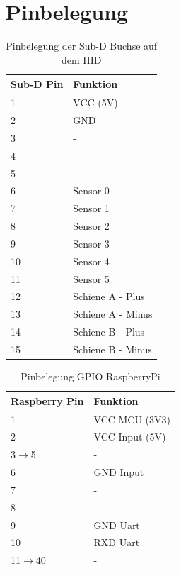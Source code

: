 \documentclass[a4paper, 11pt]{report}
\begin{document}
\section{Pinbelegung}

\begin{table}
		\begin{tabular}{|l|l|}
			\hline
			\textbf{Sub-D Pin} &\textbf{Funktion}\\
			\hline
			\hline
			1 & VCC (5V)\\
			\hline
			2 & GND\\
			\hline
			3 & -\\
			\hline
			4 & -\\
			\hline
			5 & -\\
			\hline
			6 & Sensor 0\\
			\hline
			7 & Sensor 1\\
			\hline
			8 & Sensor 2\\
			\hline
			9 & Sensor 3\\
			\hline
			10 & Sensor 4\\
			\hline
			11 & Sensor 5\\
			\hline
			12 & Schiene A - Plus\\
			\hline
			13 & Schiene A - Minus\\
			\hline
			14 & Schiene B - Plus\\
			\hline
			15 & Schiene B - Minus\\
			\hline
		\end{tabular}
		\caption{Pinbelegung der Sub-D Buchse auf dem HID}
		\label{tab:AnhangBelegungSUBD}
	\end{table}

	\begin{table}
		\begin{tabular}{|l|l|}
			\hline
			\textbf{Raspberry Pin} &\textbf{Funktion}\\
			\hline
			\hline
			1 & VCC MCU (3V3)\\
			\hline
			2 & VCC Input (5V)\\
			\hline
			3$\rightarrow$5 & -\\
			\hline
			6 & GND Input\\
			\hline
			7 & -\\
			\hline
			8 & -\\
			\hline
			9 & GND Uart\\
			\hline
			10 & RXD Uart\\
			\hline
			11$\rightarrow$40 & -\\
			\hline
		\end{tabular}
		\caption{Pinbelegung GPIO RaspberryPi}
		\label{tab:AnhangBelegungRPI}
	\end{table}
\end{document}
